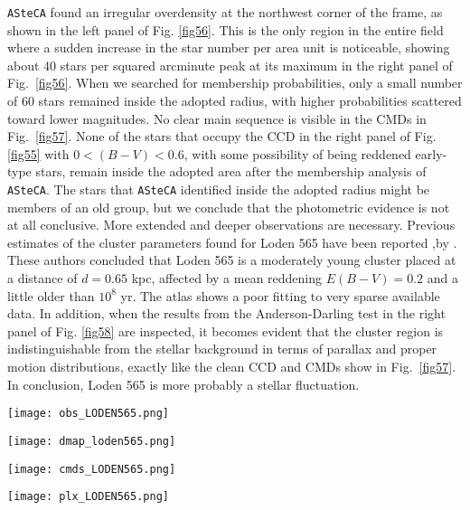 \documentclass[draft]{aa}
\begin{document}
\texttt{ASteCA} found an irregular overdensity at the northwest corner of the
frame, as shown in the left panel of Fig. \ref{fig56}. This is the only region in the
entire field where a sudden increase in the star number per area unit is
noticeable, showing about 40 stars per squared arcminute peak at its maximum in
the right panel of Fig.~\ref{fig56}.
%
When we searched for membership probabilities, only a small number of 60 stars
remained inside the adopted radius, with higher probabilities
scattered toward lower magnitudes.
No clear main sequence is visible in the CMDs in Fig.~\ref{fig57}.
None of the stars that
occupy the CCD in the right panel of Fig. \ref{fig55} with $0<(B-V)<0.6$, with some
possibility of being reddened early-type stars, remain inside the adopted area after the membership analysis of 
\texttt{ASteCA}. The stars that \texttt{ASteCA}
identified inside the adopted radius might be members of an old group, but we
conclude that the photometric evidence is not at all conclusive.
%
More extended and deeper observations are necessary. Previous estimates of the
cluster parameters found for Loden 565 have been reported  ,by \cite{Kharchenko_2005}.
These authors concluded that Loden 565 is a moderately young cluster placed at a
distance of $d=0.65$ kpc, affected by a mean reddening $E(B-V)= 0.2$ and
a little older than $10^8$ yr. The \cite{Kharchenko_2005} atlas shows a
poor fitting to very sparse available data. In addition, when the
results from the Anderson-Darling test in the right panel of Fig. \ref{fig58} are inspected,
it becomes evident that the cluster region is indistinguishable from the
stellar background in terms of parallax and proper motion distributions,
exactly like the clean CCD and CMDs show in Fig.~\ref{fig57}.\\

In conclusion, Loden 565 is more probably a stellar fluctuation.

\begin{figure*}[ht]
    \centering
    \texttt{[image: obs\_LODEN565.png]}
    \caption{Idem Fig. \ref{fig:photom_vdBH85} for Loden 565.}
    \label{fig55}
\end{figure*}
\begin{figure*}[ht]
    \centering
    \texttt{[image: dmap\_loden565.png]}
    \caption{Idem Fig. \ref{fig:struct_vdBH85} for Loden 565.}
    \label{fig56}
\end{figure*}
\begin{figure*}[ht]
    \centering
    \texttt{[image: cmds\_LODEN565.png]}
    \caption{Idem Fig. \ref{fig:fundpars_vdBH85} for Loden 565.}
    \label{fig57}
\end{figure*}
\begin{figure*}[ht]
    \centering
    \texttt{[image: plx\_LODEN565.png]}
    \caption{Idem Fig. \ref{fig:plx_bys_vdBH85} for Loden 565.}
    \label{fig58}
\end{figure*}
\end{document}
